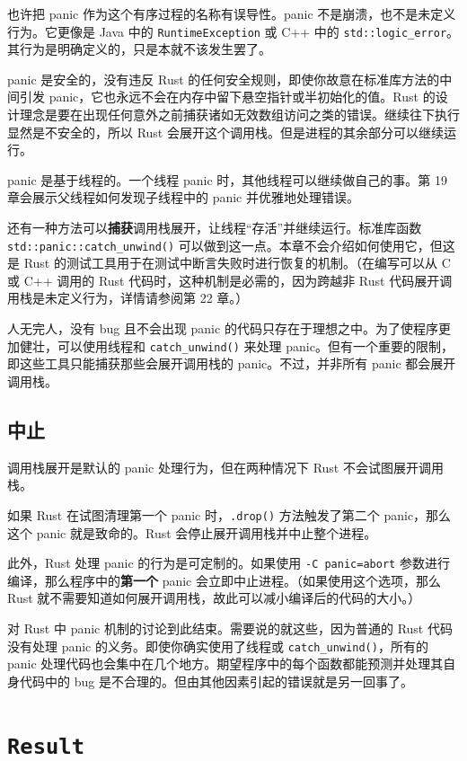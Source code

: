 也许把 panic 作为这个有序过程的名称有误导性。panic 不是崩溃，也不是未定义行为。它更像是 Java 中的 \texttt{RuntimeException} 或 C++ 中的 \texttt{std::logic\_error}。其行为是明确定义的，只是本就不该发生罢了。

panic 是安全的，没有违反 Rust 的任何安全规则，即使你故意在标准库方法的中间引发 panic，它也永远不会在内存中留下悬空指针或半初始化的值。Rust 的设计理念是要在出现任何意外之前捕获诸如无效数组访问之类的错误。继续往下执行显然是不安全的，所以 Rust 会展开这个调用栈。但是进程的其余部分可以继续运行。

panic 是基于线程的。一个线程 panic 时，其他线程可以继续做自己的事。第 19 章会展示父线程如何发现子线程中的 panic 并优雅地处理错误。

还有一种方法可以\textbf{捕获}调用栈展开，让线程“存活”并继续运行。标准库函数 \texttt{std::panic::catch\_unwind()} 可以做到这一点。本章不会介绍如何使用它，但这是 Rust 的测试工具用于在测试中断言失败时进行恢复的机制。（在编写可以从 C 或 C++ 调用的 Rust 代码时，这种机制是必需的，因为跨越非 Rust 代码展开调用栈是未定义行为，详情请参阅第 22 章。）

人无完人，没有 bug 且不会出现 panic 的代码只存在于理想之中。为了使程序更加健壮，可以使用线程和 \texttt{catch\_unwind()} 来处理 panic。但有一个重要的限制，即这些工具只能捕获那些会展开调用栈的 panic。不过，并非所有 panic 都会展开调用栈。

\subsection{中止}

调用栈展开是默认的 panic 处理行为，但在两种情况下 Rust 不会试图展开调用栈。

如果 Rust 在试图清理第一个 panic 时，\texttt{.drop()} 方法触发了第二个 panic，那么这个 panic 就是致命的。Rust 会停止展开调用栈并中止整个进程。

此外，Rust 处理 panic 的行为是可定制的。如果使用 \texttt{-C panic=abort} 参数进行编译，那么程序中的\textbf{第一个} panic 会立即中止进程。（如果使用这个选项，那么 Rust 就不需要知道如何展开调用栈，故此可以减小编译后的代码的大小。）

对 Rust 中 panic 机制的讨论到此结束。需要说的就这些，因为普通的 Rust 代码没有处理 panic 的义务。即使你确实使用了线程或 \texttt{catch\_unwind()}，所有的 panic 处理代码也会集中在几个地方。期望程序中的每个函数都能预测并处理其自身代码中的 bug 是不合理的。但由其他因素引起的错误就是另一回事了。

\section{\texttt{Result}}

